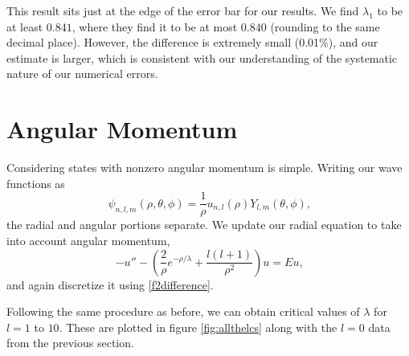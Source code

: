 \documentclass[12pt,twoside]{reedthesis}
\newcommand{\eqn}[1]{\begin{equation}#1\end{equation}}
\begin{document}
This result sits just at the edge of the error bar for our results. We find $\lambda_1$ to be at least $0.841$, where they find it to be at most $0.840$ (rounding to the same decimal place). However, the difference is extremely small (0.01\%), and our estimate is larger, which is consistent with our understanding of the systematic nature of our numerical errors. 

\section{Angular Momentum}

Considering states with nonzero angular momentum is simple. Writing our wave functions as
\eqn{
\psi_{n,l,m} (\rho,\theta,\phi) = \frac{1}{\rho}u_{n,l}(\rho) Y_{l,m}(\theta, \phi)\mbox{,}
}
the radial and angular portions separate. We update our radial equation to take into account angular momentum,
\eqn{
-u'' - \left(\frac{2}{\rho}e^{-\rho/\lambda} + \frac{l(l+1)}{\rho^2}\right) u = E u\mbox{,}
\label{eq:angmomentum}
}
and again discretize it using \eqref{f2difference}. 

Following the same procedure as before, we can obtain critical values of $\lambda$ for $l = 1$ to $10$. These are plotted in figure \ref{fig:allthelcs} along with the $l = 0$ data from the previous section.
\end{document}
